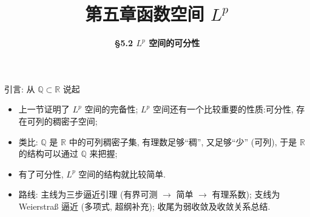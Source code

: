 


\title[第五章\\
函数空间Lp]{\texorpdfstring{\LARGE \bfseries 第五章\quad 函数空间 $L^p$}{第五章 函数空间Lp}} %
\author[\S 5.2\\
Lp空间可分性] %
{\Large \bfseries \S 5.2 $L^p$ 空间的可分性}
\date{}





\begin{frame}

\titlepage %

\end{frame}




\begin{frame}{引言: 从 $\mathbb{Q} \subset \mathbb{R}$ 说起}

\begin{itemize}
\item 上一节证明了 $L^p$ 空间的\alert{完备性}; $L^p$ 空间还有一个比较重要的性质:\alert{可分性}, 存在\alert{可列}的稠密子空间;
\item 类比: $\mathbb{Q}$ 是 $\mathbb{R}$ 中的\alert{可列稠密子集}, 有理数足够``稠'', 又足够``少'' (可列), 于是 $\mathbb{R}$ 的结构可以通过
  $\mathbb{Q}$ 来把握;
\item 有了可分性, $L^p$ 空间的结构就比较简单.
\end{itemize}

\pause

\begin{center}
\end{center}

\pause

\begin{itemize}
\item 路线: 主线为\alert{三步逼近引理} (有界可测 $\to$ 简单 $\to$ 有理系数);
  支线为 Weierstra\ss{} 逼近 (多项式, 超纲补充); 收尾为\alert{弱收敛}及收敛关系总结.
\end{itemize}

\end{frame}

